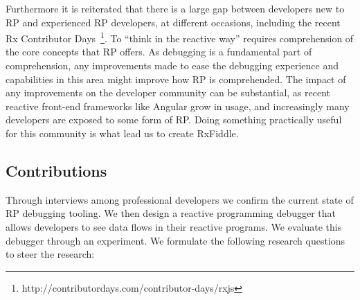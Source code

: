 Furthermore it is reiterated that there is a large gap between developers new to RP and experienced RP developers, at different occasions, including the recent Rx Contributor Days~\footnote{http://contributordays.com/contributor-days/rxjs}. To ``think in the reactive way'' requires comprehension of the core concepts that RP offers. As debugging is a fundamental part of comprehension, any improvements made to ease the debugging experience and capabilities in this area might improve how RP is comprehended.
The impact of any improvements on the developer community can be substantial, as recent reactive front-end frameworks like Angular grow in usage, and increasingly many developers are exposed to some form of RP. Doing something practically useful for this community is what lead us to create RxFiddle.

\subsection{Contributions}
Through interviews among professional developers we confirm the current state of RP debugging tooling. We then design a reactive programming debugger that allows developers to see data flows in their reactive programs. We evaluate this debugger through an experiment.
We formulate the following research questions to steer the research:

